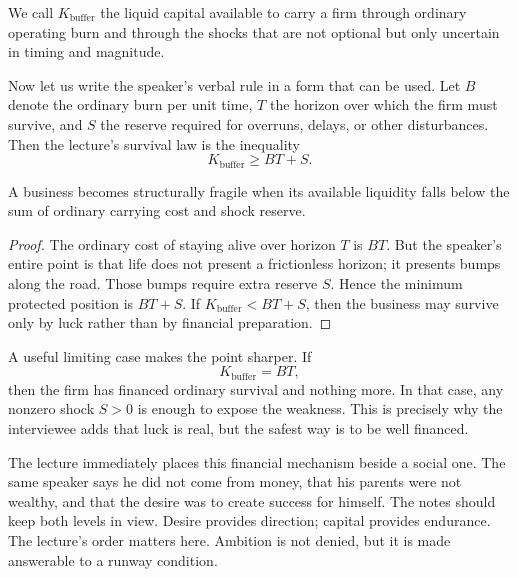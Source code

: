 \begin{definition}
We call \(K_{\text{buffer}}\) the liquid capital available to carry a firm through ordinary operating burn and through the shocks that are not optional but only uncertain in timing and magnitude.
\end{definition}

Now let us write the speaker's verbal rule in a form that can be used. Let \(B\) denote the ordinary burn per unit time, \(T\) the horizon over which the firm must survive, and \(S\) the reserve required for overruns, delays, or other disturbances. Then the lecture's survival law is the inequality
\begin{equation}
K_{\text{buffer}} \ge BT + S.
\end{equation}

\begin{proposition}
A business becomes structurally fragile when its available liquidity falls below the sum of ordinary carrying cost and shock reserve.
\end{proposition}

\begin{proof}
The ordinary cost of staying alive over horizon \(T\) is \(BT\). But the speaker's entire point is that life does not present a frictionless horizon; it presents bumps along the road. Those bumps require extra reserve \(S\). Hence the minimum protected position is \(BT+S\). If \(K_{\text{buffer}}<BT+S\), then the business may survive only by luck rather than by financial preparation.
\end{proof}

A useful limiting case makes the point sharper. If
\begin{equation}
K_{\text{buffer}} = BT,
\end{equation}
then the firm has financed ordinary survival and nothing more. In that case, any nonzero shock \(S>0\) is enough to expose the weakness. This is precisely why the interviewee adds that luck is real, but the safest way is to be well financed.

The lecture immediately places this financial mechanism beside a social one. The same speaker says he did not come from money, that his parents were not wealthy, and that the desire was to create success for himself. The notes should keep both levels in view. Desire provides direction; capital provides endurance. The lecture's order matters here. Ambition is not denied, but it is made answerable to a runway condition.

